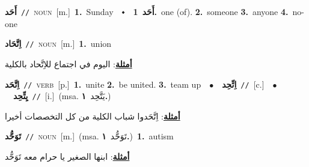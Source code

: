 \documentclass[10pt,a4paper,twoside]{article} %
\begin{document}
\begin{multicols}{2}
{\setlength\topsep{0pt}\textbf{\foreignlanguage{arabic}{أَحَد}}\ {\color{gray}\texttt{//}\color{black}}\ \textsc{noun}\ [m.]\ \textbf{1.}~Sunday\ \ $\smblkdiamond$\ \ \setlength\topsep{0pt}\textbf{\foreignlanguage{arabic}{أَحَد}}\ \textbf{1.}~one (of).  \textbf{2.}~someone  \textbf{3.}~anyone  \textbf{4.}~no-one\ } \vspace{2mm}

{\setlength\topsep{0pt}\textbf{\foreignlanguage{arabic}{اِتَّحَاد}}\ {\color{gray}\texttt{//}\color{black}}\ \textsc{noun}\ [m.]\ \textbf{1.}~union\  \begin{flushright}\color{gray}\foreignlanguage{arabic}{\textbf{\underline{\foreignlanguage{arabic}{أمثلة}}}: اليوم في اجتماع للاِتَّحاد بالكلية}\end{flushright}\color{black}} \vspace{2mm}

{\setlength\topsep{0pt}\textbf{\foreignlanguage{arabic}{اِتَّحَد}}\ {\color{gray}\texttt{//}\color{black}}\ \textsc{verb}\ [p.]\ \textbf{1.}~unite  \textbf{2.}~be united.  \textbf{3.}~team up\ \ $\bullet$\ \ \setlength\topsep{0pt}\textbf{\foreignlanguage{arabic}{اِتِّحِد}}\ {\color{gray}\texttt{//}\color{black}}\ [c.]\ \ $\bullet$\ \ \setlength\topsep{0pt}\textbf{\foreignlanguage{arabic}{يِتِّحِد}}\ {\color{gray}\texttt{//}\color{black}}\ [i.]\ \color{gray}(msa. \foreignlanguage{arabic}{يَتَّحِد}~\foreignlanguage{arabic}{\textbf{١.}})\color{black}\  \begin{flushright}\color{gray}\foreignlanguage{arabic}{\textbf{\underline{\foreignlanguage{arabic}{أمثلة}}}: اِتَّحَدوا شباب الكلية من كل التخصصات أخيرا}\end{flushright}\color{black}} \vspace{2mm}

{\setlength\topsep{0pt}\textbf{\foreignlanguage{arabic}{تَوَحُّد}}\ {\color{gray}\texttt{//}\color{black}}\ \textsc{noun}\ [m.]\ \color{gray}(msa. \foreignlanguage{arabic}{تَوَحُّد}~\foreignlanguage{arabic}{\textbf{١.}})\color{black}\ \textbf{1.}~autism\  \begin{flushright}\color{gray}\foreignlanguage{arabic}{\textbf{\underline{\foreignlanguage{arabic}{أمثلة}}}: ابنها الصغير يا حرام معه تَوَحُّد}\end{flushright}\color{black}} \vspace{2mm}


\end{multicols}
\end{document}

